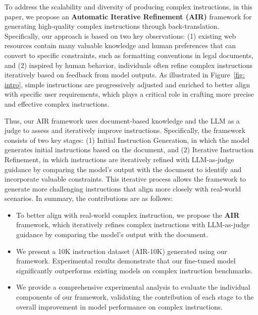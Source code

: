 To address the scalability and diversity of producing complex instructions,
in this paper, we propose an \textbf{Automatic Iterative Refinement (AIR)} framework for generating high-quality complex instructions through back-translation.
Specifically,
our approach is based on two key observations: (1) existing web resources contain many valuable knowledge and human preferences that can convert to specific constraints, such as formatting conventions in legal documents, and (2) inspired by human behavior, individuals often refine complex instructions iteratively based on feedback from model outputs. As illustrated in Figure~\ref{fig: intro}, simple instructions are progressively adjusted and enriched to better align with specific user requirements, which plays a critical role in crafting more precise and effective complex instructions.

Thus, our AIR framework uses document-based knowledge and the LLM as a judge to assess and iteratively improve instructions. 
Specifically, the framework consists of two key stages: (1) Initial Instruction Generation, in which the model generates initial instructions based on the document, and (2) Iterative Instruction Refinement, in which instructions are iteratively refined with LLM-as-judge guidance by comparing the model's output with the document to identify and incorporate valuable constraints. This iterative process allows the framework to generate more challenging instructions that align more closely with real-world scenarios. In summary, the contributions are as follows: 

\begin{itemize}[leftmargin=4mm]
    \item  To better align with real-world complex instruction, we propose the \textbf{AIR} framework, which iteratively refines complex instructions with LLM-as-judge guidance by comparing the model’s output with the document.

    \item We present a 10K instruction dataset (AIR-10K) generated using our framework. Experimental results demonstrate that our fine-tuned model significantly outperforms existing models on complex instruction benchmarks.

    \item We provide a comprehensive experimental analysis to evaluate the individual components of our framework, validating the contribution of each stage to the overall improvement in model performance on complex instructions.
\end{itemize}
